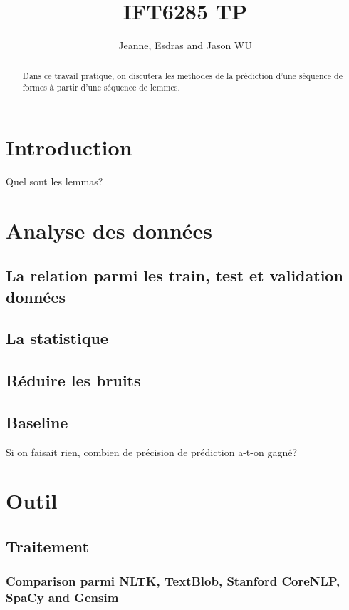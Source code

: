 \documentclass[a4paper]{article}
\title{IFT6285 TP}
\author{Jeanne, Esdras and Jason WU}
\begin{document}
\maketitle

\begin{abstract}
Dans ce travail pratique,  on discutera les methodes de la prédiction d'une séquence de formes à partir d'une séquence de lemmes.
\end{abstract}

\section{Introduction}
Quel sont les lemmas?


\section{Analyse des données}

\subsection{La relation parmi les train, test et validation données}

\subsection{La statistique}

\subsection{Réduire les bruits}

\subsection{Baseline}
Si on faisait rien, combien de précision de prédiction a-t-on gagné?

\section{Outil}
\subsection{Traitement}
\subsubsection{Comparison parmi NLTK, TextBlob, Stanford CoreNLP, SpaCy and Gensim}
\end{document}

